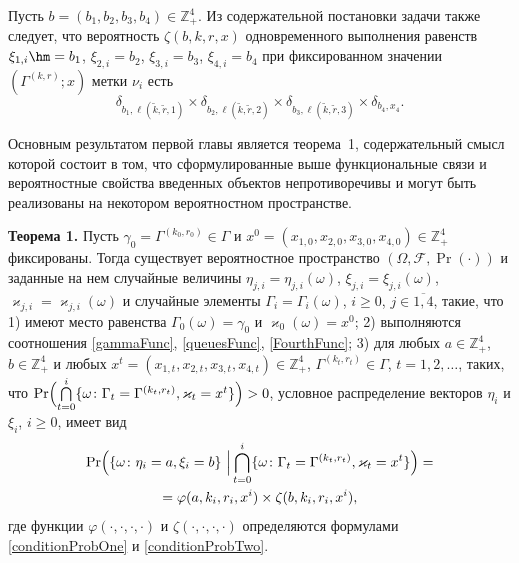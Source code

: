 Пусть $b=(b_1,  b_2,  b_3,  b_4) \in \mathbb{Z}_+^4$. Из содержательной постановки задачи также следует,  что вероятность $\zeta(b,  k,  r,  x)$ одновременного 
выполнения равенств $\xi_{1,  i}\hm=b_1$,  $\xi_{2,  i}=b_2$,  $\xi_{3,  i}=b_3$,  $\xi_{4,  i}=b_4$ при фиксированном значении $(\Gamma^{(k,  r)}; x)$ метки $\nu_i$ есть
\begin{equation}
\delta_{b_1,  \ell(\tilde{k},  \tilde{r},  1)} \times \delta_{b_2,  \ell(\tilde{k},  \tilde{r},  2)} \times 
\delta_{b_3,  \ell(\tilde{k},  \tilde{r},  3)} \times \delta_{b_4,  x_4}.
\label{conditionProbTwo}
\end{equation}


Основным результатом первой главы является теорема~1, содержательный смысл которой  состоит в том,  что сформулированные выше функциональные связи и вероятностные свойства введенных объектов непротиворечивы и могут быть реализованы на некотором вероятностном пространстве.

\textbf{Теорема 1.}
Пусть $\gamma_0=\Gamma^{(k_0,  r_0)}\in \Gamma$ и $x^0=(x_{1,  0},  x_{2,  0},   x_{3,  0},  x_{4,  0})\in \mathbb{Z}_+^4$ фиксированы.
Тогда существует вероятностное пространство $(\Omega,   {\mathcal F},   \Pr(\cdot))$ и заданные на нем случайные величины $\eta_{j,  i}=\eta_{j,  i}(\omega)$,   $\xi_{j,  i}=\xi_{j,  i}(\omega)$,   	 $\varkappa_{j,  i}=\varkappa_{j,  i}(\omega)$ и случайные элементы $\Gamma_i=\Gamma_i(\omega)$,   $i\geqslant 0$,   $j\in \overline{1,  4}$,   такие,   что 1) имеют место равенства $\Gamma_0(\omega) = \gamma_0$ и $\varkappa_0(\omega)=x^0$; 2) выполняются соотношения \eqref{gammaFunc},   \eqref{queuesFunc},   \eqref{FourthFunc}; 3) для любых  $a\in \mathbb{Z}_+^4$,   $b\in \mathbb{Z}_+^4$ и любых $x^t=(x_{1,  t},  x_{2,  t},  x_{3,  t},  x_{4,  t}) \in \mathbb{Z}_+^4$,   $\Gamma^{(k_t,  r_t)} \in \Gamma$,   $t = 1,   2,   \ldots$,   таких,   что $\Pr\Bigl(\bigcap\limits_{t=0}^{i}\{\omega\colon \Gamma_t=\Gamma^{(k_t,  r_t)},   \varkappa_t=x^t\}\Bigr)>0$,   условное распределение векторов $\eta_i$ и $\xi_i$,   $i \geqslant 0$,    имеет вид
\begin{multline}
\Pr \Bigl(\{ \omega \colon \eta_i = a,   \xi_i=b\} \,\,\Big
|\bigcap_{t=0}^{i}\{\omega\colon \Gamma_t=\Gamma^{(k_t,  r_t)},   \varkappa_t=x^t\}\Bigr)= \\=
\varphi(a,  k_i,  r_i,  x^i)\times \zeta(b,  k_i,  r_i,  x^i),  
\label{ProbablititiesToProve}
\end{multline}
где функции $\varphi(\cdot,   \cdot,   \cdot,   \cdot)$ и $\zeta(\cdot,   \cdot,   \cdot,   \cdot)$ определяются формулами \eqref{conditionProbOne} и \eqref{conditionProbTwo}.


